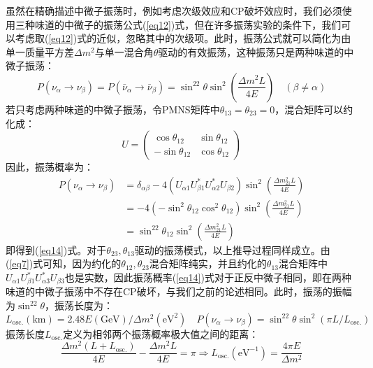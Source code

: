 \documentclass{article}
\begin{document}
		虽然在精确描述中微子振荡时，例如考虑次级效应和CP破坏效应时，我们必须使用三种味道的中微子的振荡公式(\ref{eq12})式，但在许多振荡实验的条件下，我们可以考虑取(\ref{eq12})式的近似，忽略其中的次级项。此时，振荡公式就可以简化为由单一质量平方差$\Delta m^2$与单一混合角$\theta$驱动的有效振荡，这种振荡只是两种味道的中微子振荡：
		\begin{equation}
			P(\nu_\alpha\to\nu_\beta)=P(\bar{\nu}_\alpha\to\bar{\nu}_\beta)=\sin^22\theta\sin^2\left(\frac{\Delta m^2 L}{4E}\right)\quad (\beta\ne\alpha)
			\label{eq14}
		\end{equation}
		若只考虑两种味道的中微子振荡，令PMNS矩阵中$\theta_{13}=\theta_{23}=0$，混合矩阵可以约化成：
		\begin{equation*}
			U=\begin{pmatrix}
				\cos\theta_{12}&\sin\theta_{12}\\
				-\sin\theta_{12}&\cos\theta_{12}
			\end{pmatrix}
		\end{equation*}
		因此，振荡概率为：
		\begin{equation*}
			\begin{aligned}
				P(\nu_\alpha\to\nu_\beta)&=\delta_{\alpha\beta}-4(U_{\alpha 1}U_{\beta 1}^\ast U_{\alpha 2}^\ast U_{\beta 2})\sin^2\left(\frac{\Delta m_{21}^2L}{4E}\right)\\
				&=-4(-\sin^2\theta_{12}\cos^2\theta_{12})\sin^2\left(\frac{\Delta m_{21}^2L}{4E}\right)\\
				&=\sin^22\theta_{12}\sin^2\left(\frac{\Delta m_{21}^2L}{4E}\right)
			\end{aligned}
		\end{equation*}
		即得到(\ref{eq14})式。对于$\theta_{23},\theta_{13}$驱动的振荡模式，以上推导过程同样成立。由(\ref{eq7})式可知，因为约化的$\theta_{12},\theta_{23}$混合矩阵纯实，并且约化的$\theta_{13}$混合矩阵中$U_{\alpha 1}U_{\beta 1}^\ast U_{\alpha 3}^\ast U_{\beta 3}$也是实数，因此振荡概率(\ref{eq14})式对于正反中微子相同，即在两种味道的中微子振荡中不存在CP破坏，与我们之前的论述相同。此时，振荡的振幅为$\sin^22\theta$，振荡长度为：
		\begin{equation}
			L_\mathrm{osc.}(\mathrm{km})=2.48E(\mathrm{GeV})/\Delta m^2(\mathrm{eV}^2)\quad P(\nu_\alpha\to\nu_\beta)=\sin^22\theta\sin^2(\pi L/L_\mathrm{osc.})
		\end{equation}
		振荡长度$L_\mathrm{osc.}$定义为相邻两个振荡概率极大值之间的距离：
		\begin{equation*}
			\frac{\Delta m^2(L+L_\mathrm{osc.})}{4E}-\frac{\Delta m^2 L}{4E}=\pi\Rightarrow L_\mathrm{osc.}(\mathrm{eV}^{-1})=\frac{4\pi E}{\Delta m^2}
		\end{equation*}
\end{document}

